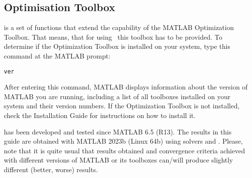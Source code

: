 \subsection{Optimisation Toolbox}
 is a set of functions that extend the capability of the
MATLAB Optimization Toolbox. That means, that for using~
this toolbox has to be provided. To determine if the Optimization
Toolbox is installed on your system, type this command at the MATLAB
prompt:
\begin{verbatim}
ver
\end{verbatim}
After entering this command, MATLAB displays information about the
version of MATLAB you are running, including a list of all toolboxes
installed on your system and their version numbers.  If the
Optimization Toolbox is not installed, check the Installation Guide
for instructions on how to install it.

 has been developed and tested since MATLAB 6.5 (R13). The
results in this guide are obtained with MATLAB 2023b (Linux 64b) using
solvers  and . Please, note that it is quite
usual that results obtained and convergence criteria achieved with
different versions of MATLAB or its toolboxes can/will produce
slightly different (better, worse) results.



